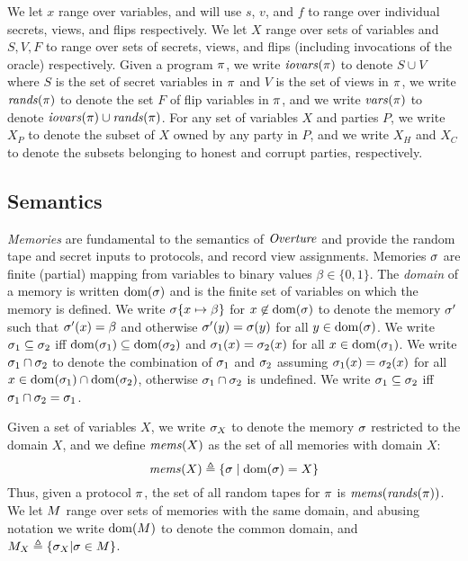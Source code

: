 We let $x$ range over variables, and will use $s$, $v$, and $f$ to
range over individual secrets, views, and flips respectively. We let
$X$ range over sets of variables and $S,V,F$ to range over sets of
secrets, views, and flips (including invocations of the oracle)
respectively. Given a program $\pi$, we write $\mathit{iovars}(\pi)$ to
denote $S \cup V$ where $S$ is the set of secret variables in $\pi$
and $V$ is the set of views in $\pi$, we write $\mathit{rands}(\pi)$ to
denote the set $F$ of flip variables in $\pi$, and we write
$\mathit{vars}(\pi)$ to denote $\mathit{iovars}(\pi) \cup \mathit{rands}(\pi)$. For any set
of variables $X$ and parties $P$, we write $X_P$ to denote the subset
of $X$ owned by any party in $P$, and we write $X_H$ and $X_C$ to
denote the subsets belonging to honest and corrupt parties,
respectively.

\subsection{Semantics}

\emph{Memories} are fundamental to the semantics of $\mathit{Overture}$ and
provide the random tape and secret inputs to protocols, and record
view assignments. Memories $\sigma$ are finite (partial) mapping from
variables to binary values $\beta \in \{0,1\}$. The \emph{domain} of a
memory is written $\mathrm{dom}(\sigma)$ and is the finite set of variables on
which the memory is defined. We write $\sigma\{ x \mapsto \beta\}$ for
$x\not\in\mathrm{dom}(\sigma)$ to denote the memory $\sigma'$ such that
$\sigma'(x) = \beta$ and otherwise $\sigma'(y) = \sigma(y)$ for all $y
\in \mathrm{dom}(\sigma)$. We write $\sigma_1 \subseteq \sigma_2$ iff
$\mathrm{dom}(\sigma_1) \subseteq \mathrm{dom}(\sigma_2)$ and $\sigma_1(x) =
\sigma_2(x)$ for all $x \in \mathrm{dom}(\sigma_1)$. We write $\sigma_1 \cap
\sigma_2$ to denote the combination of $\sigma_1$ and $\sigma_2$
assuming $\sigma_1(x) = \sigma_2(x)$ for all $x \in \mathrm{dom}(\sigma_1)
\cap \mathrm{dom}(\sigma_2)$, otherwise $\sigma_1 \cap \sigma_2$ is undefined.
We write $\sigma_1 \subseteq \sigma_2$ iff $\sigma_1 \cap \sigma_2
= \sigma_1$.

Given a set of variables $X$, we write $\sigma_X$ to denote the
memory $\sigma$ restricted to the domain $X$, and we define
$\mathit{mems}(X)$ as the set of all memories with domain $X$:
$$
\mathit{mems}(X) \triangleq \{ \sigma \mid \mathrm{dom}(\sigma) = X \}
$$
Thus, given a protocol $\pi$, the set of all random tapes for
$\pi$ is $\mathit{mems}(\mathit{rands}(\pi))$. We let $M$ range
over sets of memories with the same domain, and abusing notation
we write $\mathrm{dom}(M)$ to denote the common domain,
and $M_X \triangleq \{ \sigma_X | \sigma \in M \}$.

